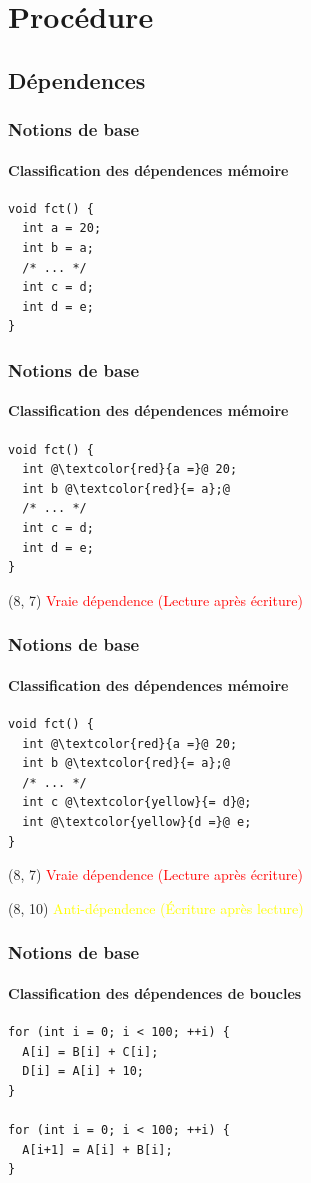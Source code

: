 \documentclass{beamer}
\begin{document}
\section{Procédure}
\subsection{Dépendences}
\begin{frame}[fragile]
\frametitle{Notions de base}
\framesubtitle{Classification des dépendences mémoire}
\begin{lstlisting}
void fct() {
  int a = 20;
  int b = a;
  /* ... */
  int c = d;
  int d = e;
}
\end{lstlisting}
\end{frame}

\begin{frame}[fragile]
\frametitle{Notions de base}
\framesubtitle{Classification des dépendences mémoire}
\begin{lstlisting}
void fct() {
  int @\textcolor{red}{a =}@ 20;
  int b @\textcolor{red}{= a};@
  /* ... */
  int c = d;
  int d = e;
}
\end{lstlisting}

\begin{textblock}{5}(8, 7)
	 \textcolor{red}{Vraie dépendence (Lecture après écriture)}
\end{textblock}
\end{frame}

\begin{frame}[fragile]
\frametitle{Notions de base}
\framesubtitle{Classification des dépendences mémoire}
\begin{lstlisting}
void fct() {
  int @\textcolor{red}{a =}@ 20;
  int b @\textcolor{red}{= a};@
  /* ... */
  int c @\textcolor{yellow}{= d}@;
  int @\textcolor{yellow}{d =}@ e;
}
\end{lstlisting}

\begin{textblock}{5}(8, 7)
	 \textcolor{red}{Vraie dépendence (Lecture après écriture)}
\end{textblock}

\begin{textblock}{5}(8, 10)
	\textcolor{yellow}{Anti-dépendence (Écriture après lecture)}
\end{textblock}
\end{frame}

\begin{frame}[fragile]
\frametitle{Notions de base}
\framesubtitle{Classification des dépendences de boucles}
\begin{lstlisting}
for (int i = 0; i < 100; ++i) {
  A[i] = B[i] + C[i];
  D[i] = A[i] + 10;
}

for (int i = 0; i < 100; ++i) {
  A[i+1] = A[i] + B[i];
}
\end{lstlisting}
\end{frame}
\end{document}
